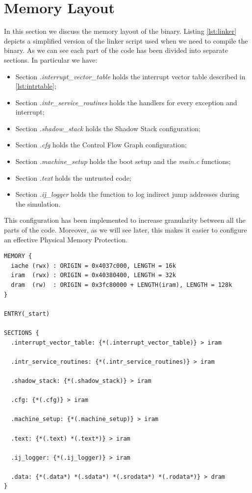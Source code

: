 \section{Memory Layout}
\label{sec:layout}

In this section we discuss the memory layout of the binary. Listing \ref{lst:linker}
depicts a simplified version of the linker script used when we need to compile the
binary. As we can see each part of the code has been divided into separate
sections. In particular we have:
\begin{itemize}[noitemsep]
  \item Section \textit{.interrupt\_vector\_table} holds the interrupt vector
    table described in \ref{lst:intrtable};

  \item Section \textit{.intr\_service\_routines} holds the handlers for every
    exception and interrupt;

  \item Section \textit{.shadow\_stack} holds the Shadow Stack configuration;

  \item Section \textit{.cfg} holds the Control Flow Graph configuration;

  \item Section \textit{.machine\_setup} holds the boot setup and the \textit{main.c}
    functions;

  \item Section \textit{.text} holds the untrusted code;

  \item Section \textit{.ij\_logger} holds the function to log indirect jump
    addresses during the simulation.
\end{itemize}

This configuration has been implemented to increase granularity between all the parts
of the code. Moreover, as we will see later, this makes it easier to configure
an effective Physical Memory Protection.

\begin{lstlisting}[style=CStyle, caption= Simplified linker script, label={lst:linker}]
MEMORY {
  iache (rwx) : ORIGIN = 0x4037c000, LENGTH = 16k
  iram  (rwx) : ORIGIN = 0x40380400, LENGTH = 32k
  dram  (rw)  : ORIGIN = 0x3fc80000 + LENGTH(iram), LENGTH = 128k
}

ENTRY(_start)

SECTIONS {
  .interrupt_vector_table: {*(.interrupt_vector_table)} > iram

  .intr_service_routines: {*(.intr_service_routines)} > iram

  .shadow_stack: {*(.shadow_stack)} > iram

  .cfg: {*(.cfg)} > iram

  .machine_setup: {*(.machine_setup)} > iram

  .text: {*(.text) *(.text*)} > iram

  .ij_logger: {*(.ij_logger)} > iram

  .data: {*(.data*) *(.sdata*) *(.srodata*) *(.rodata*)} > dram
}
\end{lstlisting}


